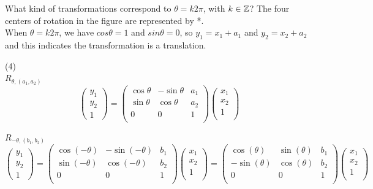 \documentclass[12pt]{article}
\begin{document}
\medskip
What kind of transformations correspond to
$\theta= k 2\pi$, with $k \in \mathbb{Z}$?
The four centers of rotation in the figure are represented by *.\\
When $\theta = k2\pi$, we have $cos\theta=1$ and $sin\theta=0$, 
so $y_1 = x_1 + a_1$ and $y_2=x_2 + a_2$ and this indicates the transformation is a translation.

\medskip
(4) \\

$R_{\theta, (a_1,a_2)}$ \\
\[
\begin{pmatrix}
y_1 \\
y_2 \\
1
\end{pmatrix}
=
\begin{pmatrix}
\cos\theta & -\sin\theta & a_1 \\
\sin\theta & \cos\theta & a_2 \\
0 & 0 & 1 \\
\end{pmatrix}
\begin{pmatrix}
x_1 \\
x_2 \\
1 \\
\end{pmatrix}
\]

$R_{-\theta, (b_1,b_2)}$ \\
\[
\begin{pmatrix}
y_1 \\
y_2 \\
1
\end{pmatrix}
=
\begin{pmatrix}
\cos(-\theta) & -\sin(-\theta) & b_1 \\
\sin(-\theta) & \cos(-\theta) & b_2 \\
0 & 0 & 1 \\
\end{pmatrix}
\begin{pmatrix}
x_1 \\
x_2 \\
1 \\
\end{pmatrix}
=
\begin{pmatrix}
\cos(\theta) & \sin(\theta) & b_1 \\
-\sin(\theta) & \cos(\theta) & b_2 \\
0 & 0 & 1 \\
\end{pmatrix}
\begin{pmatrix}
x_1 \\
x_2 \\
1 \\
\end{pmatrix}
\] \\
\end{document}
